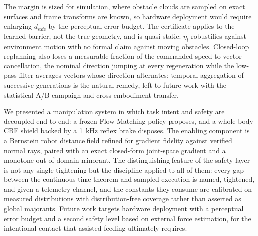 \documentclass[journal]{IEEEtran}
\newcommand{\dsafe}{d_{\mathrm{safe}}}
\begin{document}
The margin is sized for simulation, where obstacle clouds are sampled on exact surfaces and frame transforms are known, so hardware deployment would require enlarging $\dsafe$ by the perceptual error budget. The certificate applies to the learned barrier, not the true geometry, and is quasi-static: $\eta_l$ robustifies against environment motion with no formal claim against moving obstacles. Closed-loop replanning also loses a measurable fraction of the commanded speed to vector cancellation, the nominal direction jumping at every regeneration while the low-pass filter averages vectors whose direction alternates; temporal aggregation of successive generations is the natural remedy, left to future work with the statistical A/B campaign and cross-embodiment transfer.

We presented a manipulation system in which task intent and safety are decoupled end to end: a frozen Flow Matching policy proposes, and a whole-body CBF shield backed by a 1~kHz reflex brake disposes. The enabling component is a Bernstein robot distance field refined for gradient fidelity against verified normal rays, paired with an exact closed-form joint-space gradient and a monotone out-of-domain minorant. The distinguishing feature of the safety layer is not any single tightening but the discipline applied to all of them: every gap between the continuous-time theorem and sampled execution is named, tightened, and given a telemetry channel, and the constants they consume are calibrated on measured distributions with distribution-free coverage rather than asserted as global majorants. Future work targets hardware deployment with a perceptual error budget and a second safety level based on external force estimation, for the intentional contact that assisted feeding ultimately requires.



\end{document}
